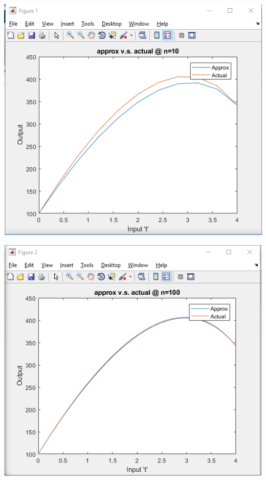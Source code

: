 \documentclass[12pt]{article}
\begin{document}
\begin{enumerate}
	\begin{center}
		\includegraphics[scale=0.6]{g1}
	\end{center} 
	\begin{center}
		\includegraphics[scale=0.6]{g2}
	\end{center} 
	\begin{center}

\end{center}
\end{enumerate}
\end{document}
